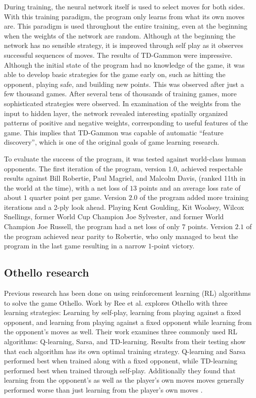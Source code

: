 \documentclass{sig-alternate-05-2015}
\begin{document}
During training, the neural network itself is used to select moves for both sides. With this training paradigm, the program only learns from what its own moves are. This paradigm is used throughout the entire training, even at the beginning when the weights of the network are random. Although at the beginning the network has no sensible strategy, it is improved through self play as it observes successful sequences of moves.
The results of TD-Gammon were impressive. Although the initial state of the program had no knowledge of the game, it was able to develop basic strategies for the game early on, such as hitting the opponent, playing safe, and building new points. This was observed after just a few thousand games. After several tens of thousands of training games, more sophisticated strategies were observed.
In examination of the weights from the input to hidden layer, the network revealed interesting spatially organized patterns of positive and negative weights, corresponding to useful features of the game. This implies that TD-Gammon was capable of automatic ``feature discovery'', which is one of the original goals of game learning research.

To evaluate the success of the program, it was tested against world-class human opponents. The first iteration of the program, version $1.0$, achieved respectable results against Bill Robertie, Paul Magriel, and Malcolm Davis, (ranked 11th in the world at the time), with a net loss of $13$ points and an average loss rate of about $1$ quarter point per game. Version $2.0$ of the program added more training iterations and a 2-ply look ahead. Playing Kent Goulding, Kit Woolsey, Wilcox Snellings, former World Cup Champion Joe Sylvester, and former World Champion Joe Russell, the program had a net loss of only $7$ points. Version $2.1$ of the program achieved near parity to Robertie, who only managed to beat the program in the last game resulting in a narrow $1$-point victory.

\subsection{Othello research}

Previous research has been done on using reinforcement learning (RL) algorithms to solve the game Othello. Work by Ree et al. explores Othello with three learning strategies: Learning by self-play, learning from playing against a fixed opponent, and learning from playing against a fixed opponent while learning from the opponent's moves as well. Their work examines three commonly used RL algorithms: Q-learning, Sarsa, and TD-learning. Results from their testing show that each algorithm has its own optimal training strategy. Q-learning and Sarsa performed best when trained along with a fixed opponent, while TD-learning performed best when trained through self-play. Additionally they found that learning from the opponent's as well as the player's own moves moves generally performed worse than just learning from the player's own moves \cite{van2013reinforcement}.
\end{document}

